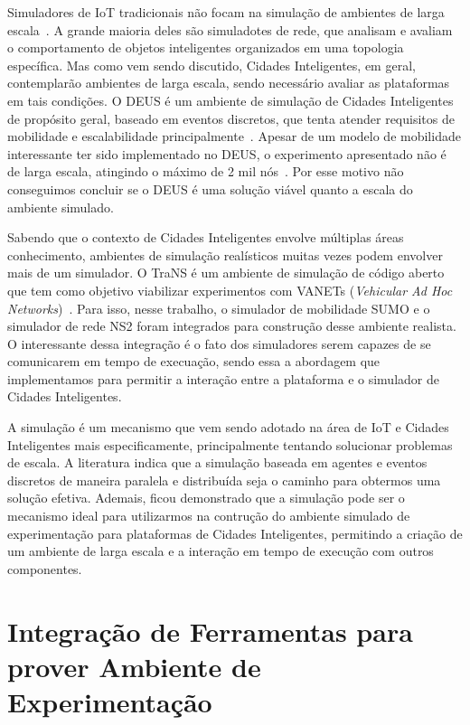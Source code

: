 Simuladores de IoT tradicionais não focam na simulação de ambientes de larga escala~\cite{brambilla_2014}.
A grande maioria deles são simuladotes de rede, que analisam e avaliam o comportamento de objetos inteligentes organizados em uma topologia específica.
Mas como vem sendo discutido, Cidades Inteligentes, em geral, contemplarão ambientes de larga escala, sendo necessário avaliar as plataformas em tais condições.
O DEUS é um ambiente de simulação de Cidades Inteligentes de propósito geral, baseado em eventos discretos, que tenta atender requisitos de mobilidade e escalabilidade principalmente~\cite{picone_2012}.
Apesar de um modelo de mobilidade interessante ter sido implementado no DEUS, o experimento apresentado não é de larga escala, atingindo o máximo de 2 mil nós~\cite{picone_2012}.
Por esse motivo não conseguimos concluir se o DEUS é uma solução viável quanto a escala do ambiente simulado.

Sabendo que o contexto de Cidades Inteligentes envolve múltiplas áreas conhecimento, ambientes de simulação realísticos muitas vezes podem envolver mais de um simulador.
O TraNS é um ambiente de simulação de código aberto que tem como objetivo viabilizar experimentos com VANETs (\textit{Vehicular Ad Hoc Networks})~\cite{piorkowski_2008}.
Para isso, nesse trabalho, o simulador de mobilidade SUMO e o simulador de rede NS2 foram integrados para construção desse ambiente realista.
O interessante dessa integração é o fato dos simuladores serem capazes de se comunicarem em tempo de execuação, sendo essa a abordagem que implementamos para permitir a interação entre a plataforma
e o simulador de Cidades Inteligentes.

A simulação é um mecanismo que vem sendo adotado na área de IoT e Cidades Inteligentes mais especificamente, principalmente tentando solucionar problemas de escala.
A literatura indica que a simulação baseada em agentes e eventos discretos de maneira paralela e distribuída seja o caminho para obtermos uma solução efetiva.
Ademais, ficou demonstrado que a simulação pode ser o mecanismo ideal para utilizarmos na contrução do ambiente simulado de experimentação para plataformas de Cidades Inteligentes, permitindo a criação
de um ambiente de larga escala e a interação em tempo de execução com outros componentes.

\section{Integração de Ferramentas para prover Ambiente de Experimentação}

